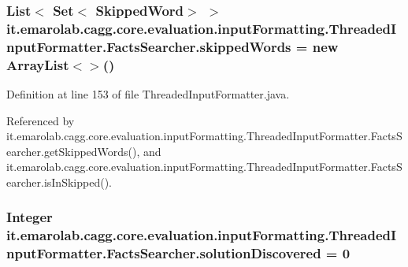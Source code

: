 \hypertarget{classit_1_1emarolab_1_1cagg_1_1core_1_1evaluation_1_1inputFormatting_1_1ThreadedInputFormatter_1_1FactsSearcher_a329a551c9f063cf71da456ac616a161f}{
\subsubsection[{skipped\-Words}]{\setlength{\rightskip}{0pt plus 5cm}List$<$ Set$<$ {\bf Skipped\-Word}$>$ $>$ it.\-emarolab.\-cagg.\-core.\-evaluation.\-input\-Formatting.\-Threaded\-Input\-Formatter.\-Facts\-Searcher.\-skipped\-Words = new Array\-List$<$$>$()\hspace{0.3cm}{\ttfamily [private]}}}\label{classit_1_1emarolab_1_1cagg_1_1core_1_1evaluation_1_1inputFormatting_1_1ThreadedInputFormatter_1_1FactsSearcher_a329a551c9f063cf71da456ac616a161f}


Definition at line 153 of file Threaded\-Input\-Formatter.\-java.



Referenced by it.\-emarolab.\-cagg.\-core.\-evaluation.\-input\-Formatting.\-Threaded\-Input\-Formatter.\-Facts\-Searcher.\-get\-Skipped\-Words(), and it.\-emarolab.\-cagg.\-core.\-evaluation.\-input\-Formatting.\-Threaded\-Input\-Formatter.\-Facts\-Searcher.\-is\-In\-Skipped().

\hypertarget{classit_1_1emarolab_1_1cagg_1_1core_1_1evaluation_1_1inputFormatting_1_1ThreadedInputFormatter_1_1FactsSearcher_ad1bcdf1188af821529dcfb66851e7c5e}{
\subsubsection[{solution\-Discovered}]{\setlength{\rightskip}{0pt plus 5cm}Integer it.\-emarolab.\-cagg.\-core.\-evaluation.\-input\-Formatting.\-Threaded\-Input\-Formatter.\-Facts\-Searcher.\-solution\-Discovered = 0\hspace{0.3cm}{\ttfamily [private]}}}\label{classit_1_1emarolab_1_1cagg_1_1core_1_1evaluation_1_1inputFormatting_1_1ThreadedInputFormatter_1_1FactsSearcher_ad1bcdf1188af821529dcfb66851e7c5e}


